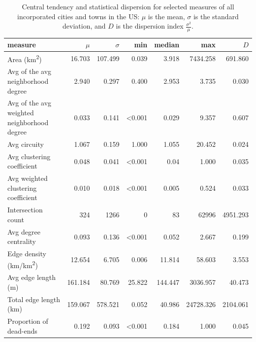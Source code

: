 \documentclass[Afour,sageh,times]{sagej}
\begin{document}
\begin{table}
\centering
\caption{Central tendency and statistical dispersion for selected measures of all incorporated cities and towns in the US: $\mu$ is the mean, $\sigma$ is the standard deviation, and $D$ is the dispersion index $\frac{\sigma ^ 2}{\mu}$.}
\label{tab:measures_cities}
\begin{tabular}{ l r r r r r r }
	\toprule
	measure                                          & $\mu$   & $\sigma$& min            & median         & max       & $D$      \\
	\midrule
	Area (km\textsuperscript{2})                     & 16.703  & 107.499 & 0.039          & 3.918          & 7434.258  & 691.860  \\
	Avg of the avg neighborhood degree               & 2.940   & 0.297   & 0.400          & 2.953          & 3.735     & 0.030    \\
	Avg of the avg weighted neighborhood degree      & 0.033   & 0.141   & \textless0.001 & 0.029          & 9.357     & 0.607    \\
	Avg circuity                                     & 1.067   & 0.159   & 1.000          & 1.055          & 20.452    & 0.024    \\
	Avg clustering coefficient                       & 0.048   & 0.041   & \textless0.001 & 0.04           & 1.000     & 0.035    \\
	Avg weighted clustering coefficient              & 0.010   & 0.018   & \textless0.001 & 0.005          & 0.524     & 0.033    \\
	Intersection count                               & 324     & 1266    & 0              & 83             & 62996     & 4951.293 \\
	Avg degree centrality                            & 0.093   & 0.136   & \textless0.001 & 0.052          & 2.667     & 0.199    \\
	Edge density (km/km\textsuperscript{2})          & 12.654  & 6.705   & 0.006          & 11.814         & 58.603    & 3.553    \\
	Avg edge length (m)                              & 161.184 & 80.769  & 25.822         & 144.447        & 3036.957  & 40.473   \\
	Total edge length (km)                           & 159.067 & 578.521 & 0.052          & 40.986         & 24728.326 & 2104.061 \\
	Proportion of dead-ends                          & 0.192   & 0.093   & \textless0.001 & 0.184          & 1.000     & 0.045    \\

\end{tabular}
\end{table}
\end{document}

